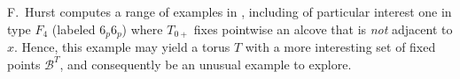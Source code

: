 \documentclass[12pt]{amsart}
\newcommand{\buil}{\mathcal{B}}
\theoremstyle{plain}
\theoremstyle{definition}
\theoremstyle{remark}
\numberwithin{equation}{section}
\numberwithin{figure}{section}
\begin{document}
F.~Hurst computes a range of examples in \cite[\S13]{Hurstthesis}, including of particular interest one in type $F_4$ (labeled $6_p6_p$) where $T_{0+}$ fixes pointwise an alcove that is \emph{not} adjacent to $x$.  Hence, this example may yield a torus $T$ with a more interesting set of fixed points $\buil^T$, and consequently be an unusual example to explore.






\end{document}
